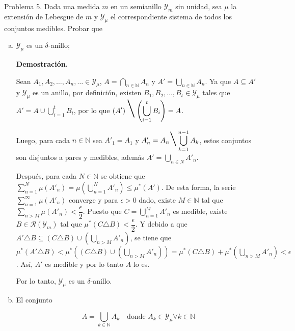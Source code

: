 \documentclass[fleqn]{article}
\begin{document}
	Problema 5. Dada una medida $m$ en un semianillo $ \mathcal{Y}_m $ sin unidad, sea $ \mu $ la extensión de Lebesgue de $m$ y $ \mathcal{Y}_\mu $ el correspondiente sistema de todos los conjuntos medibles. Probar que

	\begin{enumerate}[a)]
		\item $ \mathcal{Y}_\mu $ es un $ \delta $-anillo;
		
		\textbf{Demostración.}

		Sean $ A_1, A_2, \ldots, A_n, \ldots \in \mathcal{Y}_\mu $, $ \displaystyle A = \bigcap_{n \in \mathbb{N}} A_n $ y $ \displaystyle A' = \bigcup_{n \in \mathbb{N}} A_n $. Ya que $ A \subseteq A' $ y $ \mathcal{Y}_\mu $ es un anillo, por definición, existen $ B_1, B_2, \ldots, B_t \in \mathcal{Y}_\mu $ tales que $ \displaystyle A' = A \cup \bigcup_{i = 1}^t B_i $, por lo que $ \displaystyle \left( A' \right) \mbox{\Huge \textbackslash} \left( \bigcup_{i = 1}^t B_i \right) = A $.

		Luego, para cada $ n \in \mathbb{N} $ sea $ A'_1 = A_1 $ y $ \displaystyle A'_n = A_n \mbox{\huge \textbackslash} \bigcup_{k=1}^{n-1} A_k $, estos conjuntos son disjuntos a pares y medibles, además $ \displaystyle A' = \bigcup_{n \in N} A'_n $.

		Después, para cada $ N \in \mathbb{N} $ se obtiene que $ \displaystyle \sum_{n=1}^N \mu (A'_n) = \mu \left( \bigcup_{n=1}^N A'_n \right) \leq \mu^* (A') $. De esta forma, la serie $ \displaystyle \sum_{n=1}^\infty \mu (A'_n) $ converge y para $ \epsilon > 0 $ dado, existe $ M \in \mathbb{N} $ tal que $ \displaystyle \sum_{n>M} \mu (A'_n) < \dfrac{\epsilon}{2} $. Puesto que $ \displaystyle C = \bigcup_{n=1}^M A'_n $ es medible, existe $ B \in \mathcal{R} (\mathcal{Y}_m) $ tal que $ \displaystyle \mu^* (C \triangle B) < \dfrac{\epsilon}{2} $. Y debido a que $  \displaystyle A' \triangle B \subseteq (C \triangle B) \cup \left( \bigcup_{n>M} A'_n \right) $, se tiene que $ \displaystyle \mu^* (A' \triangle B) < \displaystyle \mu^* \left((C \triangle B) \cup \left( \bigcup_{n>M} A'_n \right) \right) = \mu^* (C \triangle B) + \mu^* \left( \bigcup_{n>M} A'_n \right) < \epsilon $. Así, $ A' $ es medible y por lo tanto $ A $ lo es.	

		Por lo tanto, $ \mathcal{Y}_\mu $ es un $ \delta $-anillo.

		\item El conjunto
		
		\begin{equation*}
			A = \bigcup_{k \in \mathbb{N}} A_k \quad \mbox{donde } A_k \in \mathcal{Y}_\mu \forall k \in \mathbb{N}
		\end{equation*}


\end{enumerate}
\end{document}

